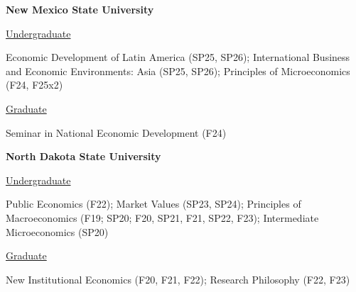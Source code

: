 \documentclass[12pt,letterpaper]{report}
\newcommand{\listitemspace}{0.15em} %
\renewenvironment{itemize}
{\begin{list}{}{\setlength{\leftmargin}{0em}
            \setlength{\parskip}{0em}
            \setlength{\itemsep}{\listitemspace}
            \setlength{\parsep}{\listitemspace}}}
{\end{list}}
\begin{document}
\begin{itemize}

\item [] \textbf{New Mexico State University}

\item [ ] \underline{Undergraduate}
\item [ ] Economic Development of Latin America (SP25, SP26); International Business and Economic Environments: Asia (SP25, SP26); Principles of Microeconomics (F24, F25x2)

\item [ ] \underline{Graduate}
\item [ ] Seminar in National Economic Development (F24)

\item [] \textbf{North Dakota State University}

\item [ ] \underline{Undergraduate}
\item [ ] Public Economics (F22);
 Market Values (SP23, SP24);
 Principles of Macroeconomics (F19; SP20; F20, SP21, F21, SP22, F23);
 Intermediate Microeconomics (SP20)

\item [ ] \underline{Graduate}
\item [ ] New Institutional Economics (F20, F21, F22);
 Research Philosophy (F22, F23)

\end{itemize}
\end{document}
